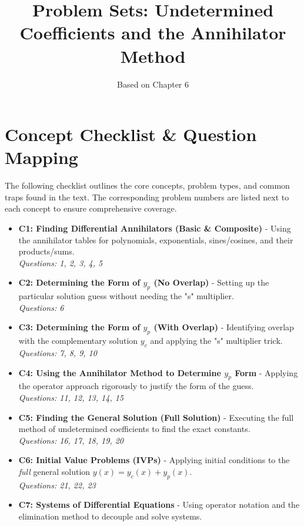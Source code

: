 \documentclass[11pt]{article}
\title{Problem Sets: Undetermined Coefficients and the Annihilator Method}
\author{Based on Chapter 6}
\date{}
\begin{document}
\maketitle
\tableofcontents
\newpage

\section{Concept Checklist \& Question Mapping}
\label{sec:checklist_start}
The following checklist outlines the core concepts, problem types, and common traps found in the text. The corresponding problem numbers are listed next to each concept to ensure comprehensive coverage.

\begin{itemize}
    \item \textbf{C1: Finding Differential Annihilators (Basic \& Composite)} - Using the annihilator tables for polynomials, exponentials, sines/cosines, and their products/sums. \\
    \textit{Questions: 1, 2, 3, 4, 5}
    \item \textbf{C2: Determining the Form of $y_p$ (No Overlap)} - Setting up the particular solution guess without needing the "s" multiplier. \\
    \textit{Questions: 6}
    \item \textbf{C3: Determining the Form of $y_p$ (With Overlap)} - Identifying overlap with the complementary solution $y_c$ and applying the "s" multiplier trick. \\
    \textit{Questions: 7, 8, 9, 10}
    \item \textbf{C4: Using the Annihilator Method to Determine $y_p$ Form} - Applying the operator approach rigorously to justify the form of the guess. \\
    \textit{Questions: 11, 12, 13, 14, 15}
    \item \textbf{C5: Finding the General Solution (Full Solution)} - Executing the full method of undetermined coefficients to find the exact constants. \\
    \textit{Questions: 16, 17, 18, 19, 20}
    \item \textbf{C6: Initial Value Problems (IVPs)} - Applying initial conditions to the \textit{full} general solution $y(x) = y_c(x) + y_p(x)$. \\
    \textit{Questions: 21, 22, 23}
    \item \textbf{C7: Systems of Differential Equations} - Using operator notation and the elimination method to decouple and solve systems. \\

\end{itemize}
\end{document}
